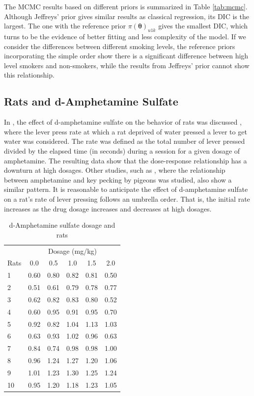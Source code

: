 \documentclass[Proceedings]{ascelike}
\begin{document}
The MCMC results based on different priors is summarized in Table
\ref{tab:mcmc}. Although Jeffreys' prior gives similar results as
classical regression, its DIC is the largest. The one with the
reference prior $\pi(\pmb\theta)_{u1k}$ gives the smallest DIC, which
turns to be the evidence of better fitting and less complexity of the
model. If we consider the differences between different smoking
levels, the reference priors incorporating the simple order show there
is a significant difference between high level smokers and
non-smokers, while the results from Jeffreys' prior cannot show this
relationship.

\subsection{Rats and d-Amphetamine
Sulfate} In \cite{Heffner1974}, the effect of d-amphetamine sulfate on
the behavior of rats was discussed , where the lever press rate at
which a rat deprived of water pressed a lever to get water was
considered. The rate was defined as the total number of lever pressed
divided by the elapsed time (in seconds) during a session for a given
dosage of amphetamine. The resulting data show that the dose-response
relationship has a downturn at high dosages. Other studies, such as
\cite{Dews1958}, where the relationship between amphetamine and key
pecking by pigeons was studied, also show a similar pattern. It is
reasonable to anticipate the effect of d-amphetamine sulfate on a
rat's rate of lever pressing follows an umbrella order. That is, the
initial rate increases as the drug dosage increases and decreases at
high dosages.
\begin{table}[h!]
  \centering
  \caption{d-Amphetamine sulfate dosage and rats}
\begin{tabular}{|l|c|c|c|c|c|}
    \hline
 & \multicolumn{5}{|c|}{Dosage (mg/kg)}   \\

\cline{2-6}
Rats & 0.0 &0.5 & 1.0 & 1.5 & 2.0 \\
\hline
1   &0.60 	&0.80 	&0.82 	&0.81 	&0.50\\
2 	&0.51 	&0.61 	&0.79 	&0.78 	&0.77\\
3 	&0.62 	&0.82 	&0.83 	&0.80 	&0.52\\
4 	&0.60 	&0.95 	&0.91 	&0.95 	&0.70\\
5 	&0.92 	&0.82 	&1.04 	&1.13 	&1.03\\
6 	&0.63 	&0.93 	&1.02 	&0.96 	&0.63\\
7 	&0.84 	&0.74 	&0.98 	&0.98 	&1.00\\
8 	&0.96 	&1.24 	&1.27 	&1.20 	&1.06\\
9 	&1.01 	&1.23 	&1.30 	&1.25 	&1.24\\
10 	&0.95 	&1.20 	&1.18 	&1.23 	&1.05\\
\hline
\end{tabular}
  \label{tab:rats}
\end{table}
\end{document}
